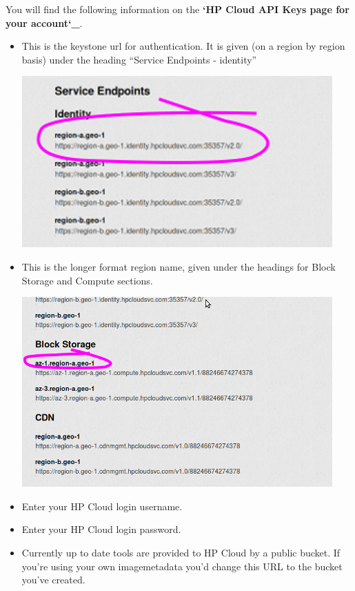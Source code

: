 \documentclass[letterpaper,10pt,english]{sphinxmanual}
\begin{document}
You will find the following information on the {\color{red}\bfseries{}{}`HP Cloud API Keys
page for your account{}`\_}.
\begin{itemize}
\item {} 
 This is the keystone url for authentication. It is given
(on a region by region basis) under the heading ``Service Endpoints -
identity''

\includegraphics{getting_started-hpc-config1.png}

\item {} 
 This is the longer format region name, given under the
headings for Block Storage and Compute sections.

\includegraphics{getting_started-hpc-region.png}

\item {} 
 Enter your HP Cloud login username.

\item {} 
 Enter your HP Cloud login password.

\item {} 
 Currently up to date tools are provided to HP
Cloud by a public bucket. If you're using your own imagemetadata you'd
change this URL to the bucket you've created.

\end{itemize}
\end{document}
